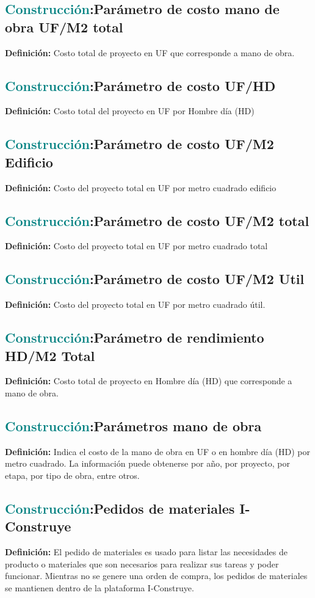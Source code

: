 \documentclass[12pt]{article}
\begin{document}
\subsection{\textcolor{teal}{Construcción}:{Parámetro de costo mano de obra UF/M2 total}}
\textbf{Definición:} Costo total de proyecto en UF que corresponde a mano de obra.
\subsection{\textcolor{teal}{Construcción}:{Parámetro de costo UF/HD}}
\textbf{Definición:} Costo total del proyecto en UF por Hombre día (HD)
\subsection{\textcolor{teal}{Construcción}:{Parámetro de costo UF/M2 Edificio}}
\textbf{Definición:} Costo del proyecto total en UF por metro cuadrado edificio
\subsection{\textcolor{teal}{Construcción}:{Parámetro de costo UF/M2 total}}
\textbf{Definición:} Costo del proyecto total en UF por metro cuadrado total
\subsection{\textcolor{teal}{Construcción}:{Parámetro de costo UF/M2 Util}}
\textbf{Definición:} Costo del proyecto total en UF por metro cuadrado útil.
\subsection{\textcolor{teal}{Construcción}:{Parámetro de rendimiento HD/M2 Total}}
\textbf{Definición:} Costo total de proyecto en Hombre día (HD) que corresponde a mano de obra.
\subsection{\textcolor{teal}{Construcción}:{Parámetros mano de obra}}
\textbf{Definición:} Indica el costo de la mano de obra en UF o en hombre día (HD) por metro cuadrado. La información puede obtenerse por año, por proyecto, por etapa, por tipo de obra, entre otros.
\subsection{\textcolor{teal}{Construcción}:{Pedidos de materiales I-Construye}}
\textbf{Definición:} El pedido de materiales es usado para listar las necesidades de producto o materiales que son necesarios para realizar sus tareas y poder funcionar. Mientras no se genere una orden de compra, los pedidos de materiales se mantienen dentro de la plataforma I-Construye.
\end{document}
